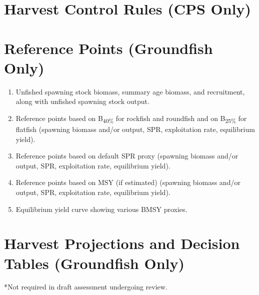 \documentclass[12pt,]{article}
\begin{document}
\section{Harvest Control Rules (CPS
Only)}\label{harvest-control-rules-cps-only}

\section{Reference Points (Groundfish
Only)}\label{reference-points-groundfish-only}

\begin{enumerate}
\def\labelenumi{\arabic{enumi}.}
\itemsep1pt\parskip0pt
\item
  Unfished spawning stock biomass, summary age biomass, and recruitment,
  along with unfished spawning stock output.
\item
  Reference points based on B\textsubscript{40\%} for rockfish and
  roundfish and on B\textsubscript{25\%} for flatfish (spawning biomass
  and/or output, SPR, exploitation rate, equilibrium yield).
\item
  Reference points based on default SPR proxy (spawning biomass and/or
  output, SPR, exploitation rate, equilibrium yield).
\item
  Reference points based on MSY (if estimated) (spawning biomass and/or
  output, SPR, exploitation rate, equilibrium yield).
\item
  Equilibrium yield curve showing various BMSY proxies.
\end{enumerate}

\section{Harvest Projections and Decision Tables (Groundfish
Only)}\label{harvest-projections-and-decision-tables-groundfish-only}

*Not required in draft assessment undergoing review.
\end{document}
